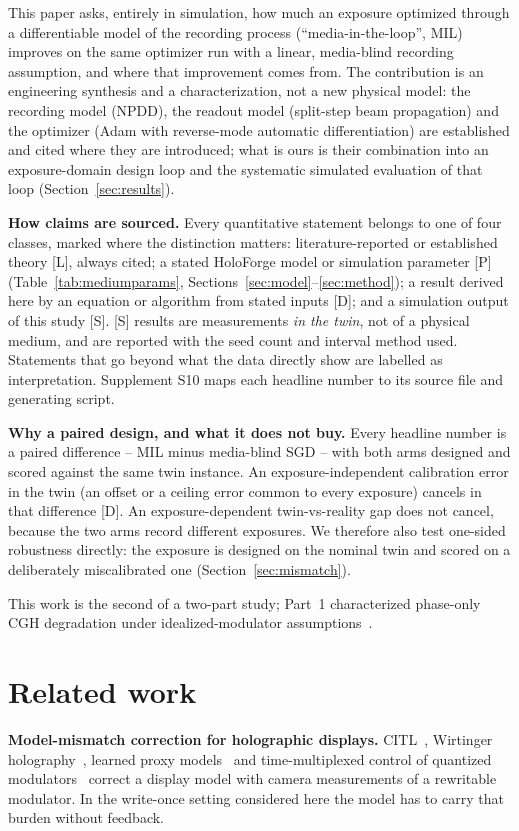 \documentclass{optica-article}
\begin{document}
This paper asks, entirely in simulation, how much an exposure optimized
through a differentiable model of the recording process (``media-in-the-loop'',
MIL) improves on the same optimizer run with a linear, media-blind recording
assumption, and where that improvement comes from. The contribution is an
engineering synthesis and a characterization, not a new physical model: the
recording model (NPDD), the readout model (split-step beam propagation) and
the optimizer (Adam with reverse-mode automatic differentiation) are
established and cited where they are introduced; what is ours is their
combination into an exposure-domain design loop and the systematic
simulated evaluation of that loop (Section~\ref{sec:results}).

\textbf{How claims are sourced.} Every quantitative statement belongs to one
of four classes, marked where the distinction matters: literature-reported
or established theory [L], always cited; a stated HoloForge model or
simulation parameter [P] (Table~\ref{tab:mediumparams}, Sections~\ref{sec:model}--\ref{sec:method}); a result derived here by an equation or
algorithm from stated inputs [D]; and a simulation output of this study
[S]. [S] results are measurements \emph{in the twin}, not of a physical
medium, and are reported with the seed count and interval method used.
Statements that go beyond what the data directly show are labelled as
interpretation. Supplement S10 maps each headline number to its source
file and generating script.

\textbf{Why a paired design, and what it does not buy.} Every headline
number is a paired difference -- MIL minus media-blind SGD -- with both arms
designed and scored against the same twin instance. An
exposure-independent calibration error in the twin (an offset or a ceiling
error common to every exposure) cancels in that difference [D]. An
exposure-dependent twin-vs-reality gap does not cancel, because the two arms
record different exposures. We therefore also test one-sided robustness
directly: the exposure is designed on the nominal twin and scored on a
deliberately miscalibrated one (Section~\ref{sec:mismatch}).

This work is the second of a two-part study; Part~1 characterized phase-only
CGH degradation under idealized-modulator assumptions~\cite{tripathi2025holoforge}.

\section{Related work}
\textbf{Model-mismatch correction for holographic displays.}
CITL~\cite{peng2020neural}, Wirtinger holography~\cite{chakravarthula2019wirtinger},
learned proxy models~\cite{shi2021towards} and time-multiplexed control of
quantized modulators~\cite{choi2022time} correct a display model with
camera measurements of a rewritable modulator. In the write-once setting
considered here the model has to carry that burden without feedback.
\end{document}
